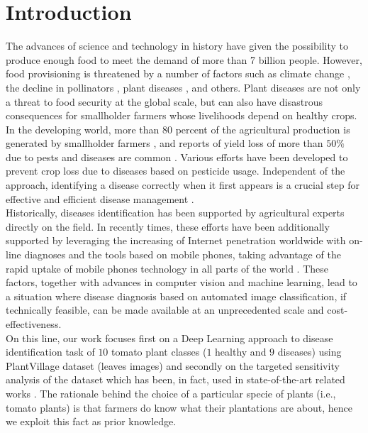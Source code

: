 \section{Introduction}
The advances of science and technology in history have given the possibility to produce enough food to meet the demand of more than 7 billion people. However, food provisioning is threatened by a number of factors such as climate change \cite{ref1}, the decline in pollinators \cite{ref2}, plant diseases \cite{ref3}, and others. Plant diseases are not only a threat to food security at the global scale, but can also have disastrous consequences for smallholder farmers whose livelihoods depend on healthy crops. In the developing world, more than 80 percent of the agricultural production is generated by smallholder farmers \cite{ref5}, and reports of yield loss of more than $50\%$ due to pests and diseases are common \cite{ref6}.
Various efforts have been developed to prevent crop loss due to diseases based on pesticide usage. Independent of the approach, identifying a disease correctly when it first appears is a crucial step for effective and efficient disease management \cite{ref8}.
\\\indent
Historically, diseases identification has been supported by agricultural experts directly on the field. In recently times, these efforts have been additionally supported by leveraging the increasing of Internet penetration worldwide with on-line diagnoses and the tools based on mobile phones, taking advantage of the rapid uptake of mobile phones technology in all parts of the world \cite{ref9}. These factors, together with advances in computer vision and machine learning, lead to a situation where disease diagnosis based on automated image classification, if technically feasible, can be made available at an unprecedented scale and cost-effectiveness.
\\\indent
On this line, our work focuses first on a Deep Learning approach to disease identification task of $10$ tomato plant classes ($1$ healthy and $9$ diseases) using PlantVillage \cite{PlantVillage} dataset (leaves images) and secondly on the targeted sensitivity analysis of the dataset which has been, in fact, used in state-of-the-art related works \cite{ref11, ref10}. The rationale behind the choice of a particular specie of plants (i.e., tomato plants) is that farmers do know what their plantations are about, hence we exploit this fact as prior knowledge.
\\\indent
